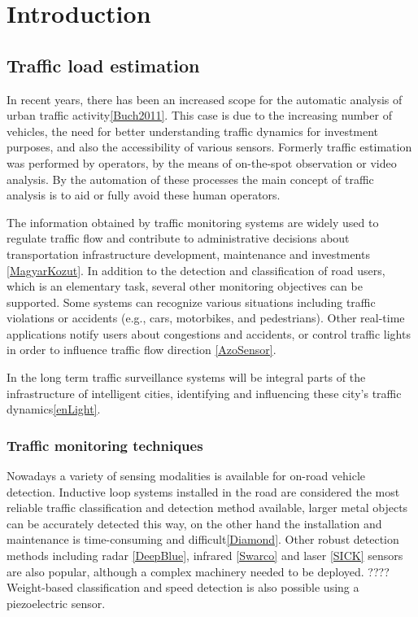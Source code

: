 \chapter*{Introduction}
\section{Traffic load estimation}
In recent years, there has been an increased scope for the automatic analysis of urban traffic activity\ref{Buch2011}.
This case is due to the increasing number of vehicles, the need for better understanding traffic dynamics for investment purposes, and also the accessibility of various sensors.
Formerly traffic estimation was performed by operators, by the means of on-the-spot observation or video analysis.
By the automation of these processes the main concept of traffic analysis is to aid or fully avoid these human operators.

The information obtained by traffic monitoring systems are widely used to regulate traffic flow and contribute to administrative decisions about transportation infrastructure development, maintenance and investments \ref{MagyarKozut}.
In addition to the detection and classification of road users, which is an elementary task, several other monitoring objectives can be supported. 
Some systems can recognize various situations including traffic violations or accidents (e.g., cars, motorbikes, and pedestrians).
Other real-time applications notify users about congestions and accidents, or control traffic lights in order to influence traffic flow direction \ref{AzoSensor}.

In the long term traffic surveillance systems will be integral parts of the infrastructure of intelligent cities, identifying and influencing these city's traffic dynamics\ref{enLight}.

\subsection{Traffic monitoring techniques}
Nowadays a variety of sensing modalities is available for on-road vehicle detection.
Inductive loop systems installed in the road are considered the most reliable traffic classification and detection method available, larger metal objects can be accurately detected this way, on the other hand the installation and maintenance is time-consuming and difficult\ref{Diamond}.
Other robust detection methods including radar \ref{DeepBlue}, infrared \ref{Swarco} and laser \ref{SICK} sensors are also popular, although a complex machinery needed to be deployed. ????
Weight-based classification and speed detection is also possible using a piezoelectric sensor.

